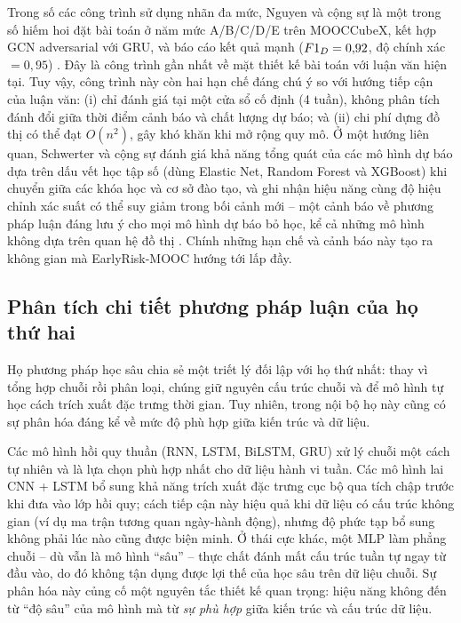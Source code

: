 Trong số các công trình sử dụng nhãn đa mức, Nguyen và cộng sự là một trong số hiếm hoi đặt bài toán ở năm mức A/B/C/D/E trên MOOCCubeX, kết hợp GCN adversarial với GRU, và báo cáo kết quả mạnh ($F1_{D} = 0{,}92$, độ chính xác $= 0{,}95$) \cite{Nguyen2025}. Đây là công trình gần nhất về mặt thiết kế bài toán với luận văn hiện tại. Tuy vậy, công trình này còn hai hạn chế đáng chú ý so với hướng tiếp cận của luận văn: (i) chỉ đánh giá tại một cửa sổ cố định (4 tuần), không phân tích đánh đổi giữa thời điểm cảnh báo và chất lượng dự báo; và (ii) chi phí dựng đồ thị có thể đạt $O(n^2)$, gây khó khăn khi mở rộng quy mô. Ở một hướng liên quan, Schwerter và cộng sự đánh giá khả năng tổng quát của các mô hình dự báo dựa trên dấu vết học tập số (dùng Elastic Net, Random Forest và XGBoost) khi chuyển giữa các khóa học và cơ sở đào tạo, và ghi nhận hiệu năng cùng độ hiệu chỉnh xác suất có thể suy giảm trong bối cảnh mới -- một cảnh báo về phương pháp luận đáng lưu ý cho mọi mô hình dự báo bỏ học, kể cả những mô hình không dựa trên quan hệ đồ thị \cite{Schwerter2026}. Chính những hạn chế và cảnh báo này tạo ra không gian mà EarlyRisk-MOOC hướng tới lấp đầy.

\subsection{Phân tích chi tiết phương pháp luận của họ thứ hai}

Họ phương pháp học sâu chia sẻ một triết lý đối lập với họ thứ nhất: thay vì tổng hợp chuỗi rồi phân loại, chúng giữ nguyên cấu trúc chuỗi và để mô hình tự học cách trích xuất đặc trưng thời gian. Tuy nhiên, trong nội bộ họ này cũng có sự phân hóa đáng kể về mức độ phù hợp giữa kiến trúc và dữ liệu.

Các mô hình hồi quy thuần (RNN, LSTM, BiLSTM, GRU) xử lý chuỗi một cách tự nhiên và là lựa chọn phù hợp nhất cho dữ liệu hành vi tuần. Các mô hình lai CNN + LSTM \cite{Mubarak2021,Fu2021} bổ sung khả năng trích xuất đặc trưng cục bộ qua tích chập trước khi đưa vào lớp hồi quy; cách tiếp cận này hiệu quả khi dữ liệu có cấu trúc không gian (ví dụ ma trận tương quan ngày-hành động), nhưng độ phức tạp bổ sung không phải lúc nào cũng được biện minh. Ở thái cực khác, một MLP làm phẳng chuỗi \cite{Xing2019} -- dù vẫn là mô hình ``sâu'' -- thực chất đánh mất cấu trúc tuần tự ngay từ đầu vào, do đó không tận dụng được lợi thế của học sâu trên dữ liệu chuỗi. Sự phân hóa này củng cố một nguyên tắc thiết kế quan trọng: hiệu năng không đến từ ``độ sâu'' của mô hình mà từ \emph{sự phù hợp} giữa kiến trúc và cấu trúc dữ liệu.

